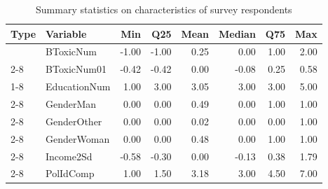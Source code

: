 \documentclass{article}
\begin{document}


\begin{table}[h]
\centering
\caption{\label{tab:summ-tab1}Summary statistics on characteristics of survey respondents}
\centering
\begin{tabular}[t]{l|l|r|r|r|r|r|r}
\hline
Type & Variable & Min & Q25 & Mean & Median & Q75 & Max\\
\hline
 & BToxicNum & -1.00 & -1.00 & 0.25 & 0.00 & 1.00 & 2.00\\
\cline{2-8}
\multirow{\raggedright\arraybackslash Dependent Variable} & BToxicNum01 & -0.42 & -0.42 & 0.00 & -0.08 & 0.25 & 0.58\\
\cline{1-8}
 & EducationNum & 1.00 & 3.00 & 3.05 & 3.00 & 3.00 & 5.00\\
\cline{2-8}
 & GenderMan & 0.00 & 0.00 & 0.49 & 0.00 & 1.00 & 1.00\\
\cline{2-8}
 & GenderOther & 0.00 & 0.00 & 0.02 & 0.00 & 0.00 & 1.00\\
\cline{2-8}
 & GenderWoman & 0.00 & 0.00 & 0.48 & 0.00 & 1.00 & 1.00\\
\cline{2-8}
 & Income2Sd & -0.58 & -0.30 & 0.00 & -0.13 & 0.38 & 1.79\\
\cline{2-8}
\multirow{\raggedright\arraybackslash Demographics} & PolIdComp & 1.00 & 1.50 & 3.18 & 3.00 & 4.50 & 7.00\\
\hline
\end{tabular}
\end{table}



\clearpage
\end{document}

